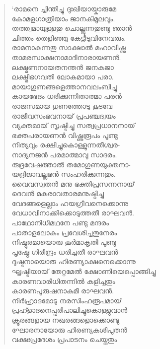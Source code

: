 \begin{verse}
‘രാമനെ ച്ചിന്തിച്ചു ദുഃഖിയായ്കാരുമേ\\
കോമളഗാത്രിയാം ജാനകിമൂലവും.\\
തത്ത്വമായുള്ളതു ചൊല്ലുന്നതുണ്ടു ഞാന്‍\\
ചിത്തം തെളിഞ്ഞു കേട്ടീടുവിനേവരും.\\
രാമനാകുന്നതു സാക്ഷാല്‍ മഹാവിഷ്ണു\\
താമരസാക്ഷനാമാദിനാരായണന്‍.\\
ലക്ഷ്മണനായതനന്തന്‍ ജനകജാ\\
ലക്ഷ്മീഭഗവതി ലോകമായാ പരാ.\\
മായാഗുണങ്ങളെത്താനവലംബിച്ചു\\
കായഭേദം ധരിക്കുന്നിതാത്മാ പരന്‍\\
രാജസമായ ഗുണത്തോടു കൂടവേ\\
രാജീവസംഭവനായ് പ്രപഞ്ചദ്വയം\\
വ്യക്തമായ് സൃഷ്ടിച്ചു സത്വപ്രധാനനായ്\\
ഭക്തപരായണന്‍ വിഷ്ണുരൂപം പൂണ്ടു\\
നിത്യവും രക്ഷിച്ചുകൊള്ളുന്നതീശ്വര-\\
നാദ്യനജന്‍ പരമാത്മാവു സാദരം.\\
രുദ്രവേഷത്താല്‍ തമോഗുണയുക്തനാ-\\
യദ്രിജാവല്ലഭന്‍ സംഹരിക്കുന്നതും.\\
വൈവസ്വതന്‍ മനു ഭക്തിപ്രസന്നനായ്\\
ദെവന്‍ മകരാവതാരമനുഷ്ഠിച്ചു\\
വേദങ്ങളെല്ലാം ഹയഗ്രീവനെക്കൊന്നു\\
വേധാവിനാക്കിക്കൊടുത്തതീ രാഘവന്‍.\\
പാഥോനിധിമഥനേ പണ്ടു മന്ദരം\\
പാതാളലോകം പ്രവേശിച്ചതുനേരം\\
നിഷ്ഠുരമായൊരു കൂര്‍മാകൃതി പൂണ്ടു\\
പൃഷ്ഠേ ഗിരീന്ദ്രം ധരിച്ചതീ രാഘവന്‍\\
ദുഷ്ടനായൊരു ഹിരണ്യാക്ഷനെക്കൊന്നു\\
ഘൃഷ്ടിയായ് തേറ്റമേല്‍ ക്ഷോണിയെപ്പൊങ്ങിച്ചു\\
കാരണവാരിധിതന്നില്‍ കളിച്ചതും\\
കാരണപൂരുഷനാകുമീ രാഘവന്‍.\\
നിര്‍ഹ്രാദമോടു നരസിംഹരൂപമായ്\\
പ്രഹ്ളാദനെപ്പരിപാലിച്ചുകൊള്ളുവാന്‍\\
ക്രൂരങ്ങളായ നഖരങ്ങളൊക്കൊണ്ടു\\
ഘോരനായോരു ഹിരണ്യകശിപുതന്‍\\
വക്ഷഃപ്രദേശം പ്രപാടനം ചെയ്തതും\\

\end{verse}
